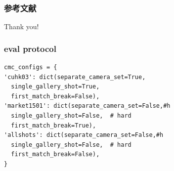 \documentclass[notes]{beamer}
\newcommand{\chuhao}{\fontsize{44.9pt}{\baselineskip}\selectfont}
\begin{document}
\begin{frame}[t, allowframebreaks]
	\frametitle{参考文献}
	\printbibliography
\end{frame}

\begin{frame}
	\chuhao Thank you! %
\end{frame}


\begin{frame}[fragile]
	\frametitle{eval protocol}
	\begin{lstlisting}
cmc_configs = {
'cuhk03': dict(separate_camera_set=True,
  single_gallery_shot=True,
  first_match_break=False),
'market1501': dict(separate_camera_set=False,#h
  single_gallery_shot=False,  # hard
  first_match_break=True),
'allshots': dict(separate_camera_set=False,#h
  single_gallery_shot=False,  # hard
  first_match_break=False),
}
\end{lstlisting}
\end{frame}
\end{document}
